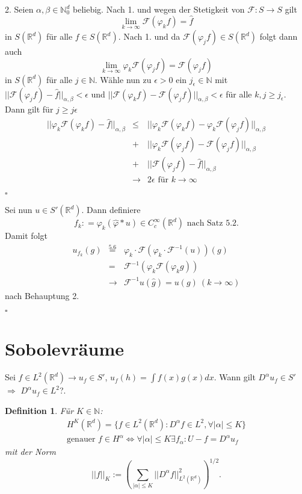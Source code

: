 \documentclass[11pt,a4paper,titlepage, ngerman]{scrartcl}
\newtheorem{Definition}[Satz]{Definition}
\numberwithin{equation}{section}
\newcommand{\R}{\mathbb{R}} %
\newcommand{\N}{\mathbb{N}} %
\newcommand{\f}{\hat{f}}
\newcommand{\g}{\hat{g}}
\newcommand{\F}{\mathcal{F}}
\newcommand{\m}{\cdot}
\newcommand{\qed}{\begin{flushright}
		$\square$
	\end{flushright}}
\begin{document}
	2. Seien $\alpha,\beta\in \N_0^d$ beliebig. Nach 1. und wegen der Stetigkeit von $\F: S\rightarrow S$ gilt
	$$\lim\limits_{k\rightarrow\infty}\F(\varphi_k f) = \f$$ 
	in $S(\R^d)$ für alle $f\in S(\R^d)$. Nach 1. und da $\F(\varphi_j f)\in S(\R^d)$ folgt dann auch 
	$$\lim\limits_{k\rightarrow\infty}\varphi_k \F(\varphi_j f) = \F(\varphi_j f)$$
	in $S(\R^d)$ für alle $j\in \N$. Wähle nun zu $\epsilon>0$ ein $j_\epsilon\in \N$ mit $||\F(\varphi_j f)-\f||_{\alpha,\beta} <\epsilon$ und $||\F(\varphi_k f)-\F(\varphi_j f)||_{\alpha,\beta}<\epsilon$ für alle $k,j\geq j_\epsilon$. Dann gilt für $j\geq j\epsilon$
	\begin{eqnarray}
		||\varphi_k\F(\varphi_k f)-\f||_{\alpha,\beta}&\leq & ||\varphi_k\F(\varphi_k f) - \varphi_k\F(\varphi_j f)||_{\alpha,\beta}\nonumber\\
		&+& ||\varphi_k\F(\varphi_j f) - \F(\varphi_j f)||_{\alpha,\beta}\nonumber\\
		&+& ||\F(\varphi_j f) - \f||_{\alpha,\beta}\nonumber\\
		&\rightarrow& 2\epsilon \text{ für } k\rightarrow\infty\nonumber
	\end{eqnarray} %
	\qed
	
	Sei nun $u\in S'(\R^d)$. Dann definiere 
	$$f_k: = \varphi_k(\hat{\varphi}* u)\in C_c^\infty(\R^d) \text{ nach Satz 5.2}.$$
	Damit folgt 
	\begin{eqnarray}
		u_{f_k}(g) &\overset{\text{5.6}}{=}& \varphi_k\m\F(\varphi_k\m\F^{-1}(u))(g) \nonumber\\
		&=& \F^{-1}(\varphi_k\F(\varphi_k g))\nonumber\\
		&\rightarrow& \F^{-1}u(\g) = u(g)~(k\rightarrow\infty)\nonumber
	\end{eqnarray}
	nach Behauptung 2.
	\qed

	\newpage
	
	\section{Sobolevräume}
	
	Sei $f\in L^2(\R^d)\rightarrow u_f\in S'$, $u_f(h) =\int f(x)g(x) dx$. Wann gilt $D^\alpha u_f\in S'$ $\Rightarrow$ $D^\alpha u_f \in L^2$?.
	
	\begin{Definition}
		Für $K\in \N$: 
		\begin{eqnarray}
			H^K(\R^d) =\{f\in L^2(\R^d): D^\alpha f\in L^2, \forall |\alpha|\leq K \}\nonumber\\
			\text{genauer } f\in H^\alpha\Leftrightarrow \forall|\alpha|\leq K\exists f_\alpha: U-f=D^\alpha u_f\nonumber
		\end{eqnarray}
		mit der Norm
		$$||f||_K:= \left(\sum_{|\alpha|\leq K}||D^\alpha f||_{L^2(\R^d)}^2 \right)^{1/2}.$$
	\end{Definition}
	
\end{document}

